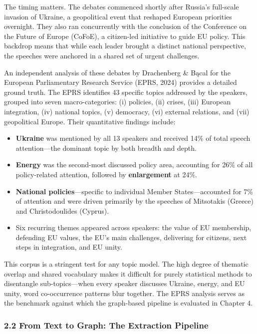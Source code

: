 \documentclass[11pt]{article}
\begin{document}
The timing matters. The debates commenced shortly after Russia's full-scale invasion of Ukraine, a geopolitical event that reshaped European priorities overnight. They also ran concurrently with the conclusion of the Conference on the Future of Europe (CoFoE), a citizen-led initiative to guide EU policy. This backdrop means that while each leader brought a distinct national perspective, the speeches were anchored in a shared set of urgent challenges.

An independent analysis of these debates by Drachenberg \& B\k{a}cal for the European Parliamentary Research Service (EPRS, 2024) provides a detailed ground truth. The EPRS identifies 43 specific topics addressed by the speakers, grouped into seven macro-categories: (i) policies, (ii) crises, (iii) European integration, (iv) national topics, (v) democracy, (vi) external relations, and (vii) geopolitical Europe. Their quantitative findings include:

\begin{itemize}
  \item \textbf{Ukraine} was mentioned by all 13 speakers and received 14\% of total speech attention---the dominant topic by both breadth and depth.
  \item \textbf{Energy} was the second-most discussed policy area, accounting for 26\% of all policy-related attention, followed by \textbf{enlargement} at 24\%.
  \item \textbf{National policies}---specific to individual Member States---accounted for 7\% of attention and were driven primarily by the speeches of Mitsotakis (Greece) and Christodoulides (Cyprus).
  \item Six recurring themes appeared across speakers: the value of EU membership, defending EU values, the EU's main challenges, delivering for citizens, next steps in integration, and EU unity.
\end{itemize}

This corpus is a stringent test for any topic model. The high degree of thematic overlap and shared vocabulary makes it difficult for purely statistical methods to disentangle sub-topics---when every speaker discusses Ukraine, energy, and EU unity, word co-occurrence patterns blur together. The EPRS analysis serves as the benchmark against which the graph-based pipeline is evaluated in Chapter 4.


\subsubsection{2.2 From Text to Graph: The Extraction Pipeline}
\end{document}
